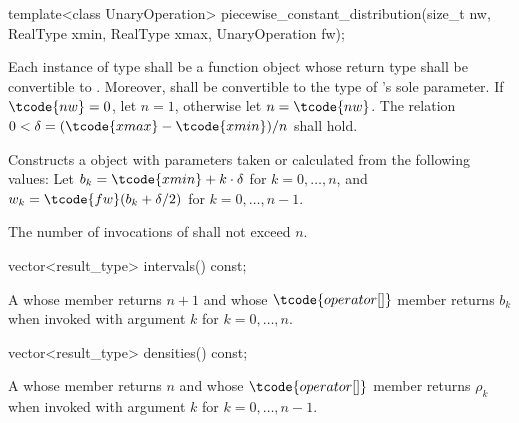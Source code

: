 %
\begin{itemdecl}
template<class UnaryOperation>
 piecewise_constant_distribution(size_t nw, RealType xmin, RealType xmax, UnaryOperation fw);
\end{itemdecl}

\begin{itemdescr}
\pnum\requires
 Each instance of type 
 shall be a function object
 whose return type shall be convertible to .
 Moreover,
  shall be convertible
 to the type of 's sole parameter.
 If $\tcode{nw} = 0$, let $n = 1$, otherwise let $n = \tcode{nw}$.
 The relation $0 < \delta = (\tcode{xmax} - \tcode{xmin}) / n$
 shall hold.

\pnum\effects Constructs a  object
 with parameters taken or calculated
 from the following values:
 Let $b_k = \tcode{xmin} + k \cdot \delta $ for $ k = 0, \dotsc, n$,
 and $w_k = \tcode{fw}(b_k + \delta / 2) $ for $ k = 0, \dotsc, n - 1$.

\pnum\complexity
 The number of invocations of  shall not exceed $n$.
\end{itemdescr}

%
\begin{itemdecl}
vector<result_type> intervals() const;
\end{itemdecl}

\begin{itemdescr}
\pnum\returns A 
 whose  member returns $n + 1$
 and whose $ \tcode{operator[]} $ member returns $b_k$
 when invoked with argument $k$ for $k = 0, \dotsc, n $.
\end{itemdescr}

%
\begin{itemdecl}
vector<result_type> densities() const;
\end{itemdecl}

\begin{itemdescr}
\pnum\returns A 
 whose  member returns $n$
 and whose $ \tcode{operator[]} $ member returns $\rho_k$
 when invoked with argument $k$ for $k = 0, \dotsc, n - 1$.
\end{itemdescr}



